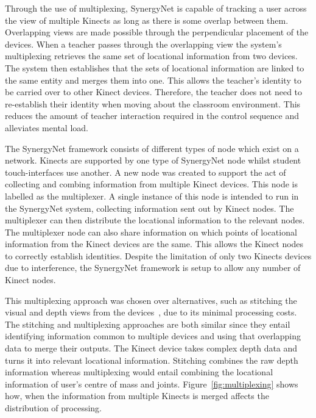 \documentclass[link]{IWCOMP}
\begin{document}
Through the use of multiplexing, SynergyNet is capable of tracking a user across the view of multiple Kinects as long as there is some overlap between them.
Overlapping views are made possible through the perpendicular placement of the devices. 
When a teacher passes through the overlapping view the system's multiplexing retrieves the same set of locational information from two devices.
The system then establishes that the sets of locational information are linked to the same entity and merges them into one.
This allows the teacher's identity to be carried over to other Kinect devices.
Therefore, the teacher does not need to re-establish their identity when moving about the classroom environment.
This reduces the amount of teacher interaction required in the control sequence and alleviates mental load. 

The SynergyNet framework consists of different types of node which exist on a network.
Kinects are supported by one type of SynergyNet node whilst student touch-interfaces use another.
A new node was created to support the act of collecting and combing information from multiple Kinect devices.
This node is labelled as the multiplexer.
A single instance of this node is intended to run in the SynergyNet system, collecting information sent out by Kinect nodes.
The multiplexer can then distribute the locational information to the relevant nodes.
The multiplexer node can also share information on which points of locational information from the Kinect devices are the same.
This allows the Kinect nodes to correctly establish identities.
Despite the limitation of only two Kinects devices due to interference, the SynergyNet framework is setup to allow any number of Kinect nodes.

This multiplexing approach was chosen over alternatives, such as stitching the visual and depth views from the devices~\cite{Dubois2011}, due to its minimal processing costs.
The stitching and multiplexing approaches are both similar since they entail identifying information common to multiple devices and using that overlapping data to merge their outputs.
The Kinect device takes complex depth data and turns it into relevant locational information.
Stitching combines the raw depth information whereas multiplexing would entail combining the locational information of user's centre of mass and joints.
Figure~\ref{fig:multiplexing} shows how, when the information from multiple Kinects is merged affects the distribution of processing.
\end{document}
